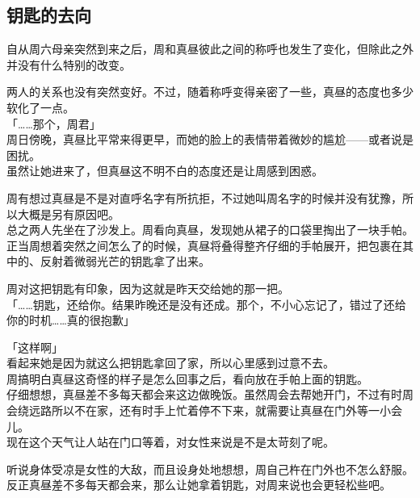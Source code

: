 \subsection{钥匙的去向}

自从周六母亲突然到来之后，周和真昼彼此之间的称呼也发生了变化，但除此之外并没有什么特别的改变。

两人的关系也没有突然变好。不过，随着称呼变得亲密了一些，真昼的态度也多少软化了一点。\\

「……那个，周君」\\

周日傍晚，真昼比平常来得更早，而她的脸上的表情带着微妙的尴尬——或者说是困扰。\\

虽然让她进来了，但真昼这不明不白的态度还是让周感到困惑。

周有想过真昼是不是对直呼名字有所抗拒，不过她叫周名字的时候并没有犹豫，所以大概是另有原因吧。\\

总之两人先坐在了沙发上。周看向真昼，发现她从裙子的口袋里掏出了一块手帕。\\

正当周想着突然之间怎么了的时候，真昼将叠得整齐仔细的手帕展开，把包裹在其中的、反射着微弱光芒的钥匙拿了出来。

周对这把钥匙有印象，因为这就是昨天交给她的那一把。\\

「……钥匙，还给你。结果昨晚还是没有还成。那个，不小心忘记了，错过了还给你的时机……真的很抱歉」

「这样啊」\\

看起来她是因为就这么把钥匙拿回了家，所以心里感到过意不去。\\

周搞明白真昼这奇怪的样子是怎么回事之后，看向放在手帕上面的钥匙。\\

仔细想想，真昼差不多每天都会来这边做晚饭。虽然周会去帮她开门，不过有时周会绕远路所以不在家，还有时手上忙着停不下来，就需要让真昼在门外等一小会儿。\\

现在这个天气让人站在门口等着，对女性来说是不是太苛刻了呢。

听说身体受凉是女性的大敌，而且设身处地想想，周自己杵在门外也不怎么舒服。\\

反正真昼差不多每天都会来，那么让她拿着钥匙，对周来说也会更轻松些吧。\\

